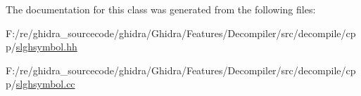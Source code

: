 The documentation for this class was generated from the following files\+:\begin{DoxyCompactItemize}
\item 
F\+:/re/ghidra\+\_\+sourcecode/ghidra/\+Ghidra/\+Features/\+Decompiler/src/decompile/cpp/\mbox{\hyperlink{slghsymbol_8hh}{slghsymbol.\+hh}}\item 
F\+:/re/ghidra\+\_\+sourcecode/ghidra/\+Ghidra/\+Features/\+Decompiler/src/decompile/cpp/\mbox{\hyperlink{slghsymbol_8cc}{slghsymbol.\+cc}}\end{DoxyCompactItemize}
